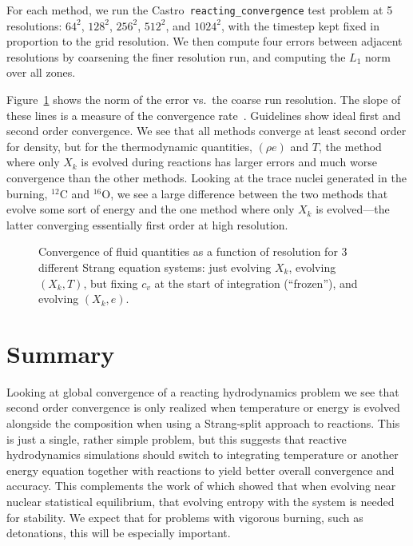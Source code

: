 \documentclass[times,preprint]{aastex63}
\newcommand{\castro}{{\sf Castro}}
\newcommand{\isotm}[2]{{}^{#2}\mathrm{#1}}
\begin{document}
For each method, we run the \castro\ {\tt reacting\_convergence} test
problem at 5 resolutions: $64^2$, $128^2$, $256^2$, $512^2$, and
$1024^2$, with the timestep kept fixed in proportion to the grid resolution.
We then compute four errors between adjacent resolutions by
coarsening the finer resolution run, and computing the $L_1$ norm over
all zones.  

Figure~\ref{thefigure} shows the norm of the error vs.\ the coarse run
resolution.  The slope of these lines is a measure of the convergence
rate~\citep{ORVV}.  Guidelines show ideal first and second order
convergence.  We see that all methods converge at least second order
for density, but for the thermodynamic quantities, $(\rho e)$ and $T$,
the method where only $X_k$ is evolved during reactions has larger
errors and much worse convergence than the other methods.  Looking at
the trace nuclei generated in the burning, $\isotm{C}{12}$ and
$\isotm{O}{16}$, we see a large difference between the two methods
that evolve some sort of energy and the one method where only $X_k$ is
evolved---the latter converging essentially first order at high
resolution.

\begin{figure}[t]
\centering
{}
\caption{\label{thefigure} Convergence of fluid quantities as a function of resolution
for 3 different Strang equation systems: just evolving $X_k$, evolving $(X_k, T)$, but fixing $c_v$ at the start of integration (``frozen''), and evolving $(X_k, e)$.}
\end{figure}




\section{Summary}

Looking at global convergence of a reacting hydrodynamics problem we
see that second order convergence is only realized when temperature or
energy is evolved alongside the composition when using a Strang-split
approach to reactions.  This is just a single, rather simple problem,
but this suggests that reactive hydrodynamics simulations should
switch to integrating temperature or another energy equation together
with reactions to yield better overall convergence and accuracy.  This
complements the work of \citep{muller:1986} which showed that when
evolving near nuclear statistical equilibrium, that evolving entropy
with the system is needed for stability.  We expect that for problems
with vigorous burning, such as detonations, this will be especially
important.
\end{document}
